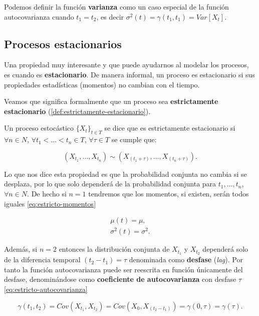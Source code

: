 Podemos definir la función \textbf{varianza} como un caso especial de la función autocovarianza cuando $t_1 = t_2$, es decir $\sigma^2(t) = \gamma(t_1, t_1) = Var[X_t]$.

\subsection{Procesos estacionarios}

Una propiedad muy interesante y que puede ayudarnos al modelar los procesos, es cuando es \textbf{estacionario}. De manera informal, un proceso es estacionario si sus propiedades estadísticas (momentos) no cambian con el tiempo.

Veamos que significa formalmente que un proceso sea \textbf{estrictamente estacionario} (\autoref{def:estrictamente-estacionario}).

\begin{definicion}
  Un proceso estocástico $\{X_t\}_{t \in T}$ se dice que es estrictamente estacionario si $\forall n \in N$, $\forall t_1 < \ldots < t_n \in T$, $\forall \tau \in T$ se cumple que:

    $$\left( X_{t_1}, \ldots, X_{t_n}\right) \sim \left( X_{(t_1 + \tau)}, \ldots, X_{(t_n + \tau)}\right).$$
  \label{def:estrictamente-estacionario}
\end{definicion}

Lo que nos dice esta propiedad es que la probabilidad conjunta no cambia si se desplaza, por lo que solo dependerá de la probabilidad conjunta para $t_1, \ldots, t_n$, $\forall n \in N$. De hecho si $n=1$ tendremos que los momentos, si existen, serán todos iguales \eqref{eq:estricto-momentos}

\begin{gather}
  \mu(t) = \mu, \\
  \sigma^2(t) = \sigma^2.
  \label{eq:estricto-momentos}
\end{gather}

Además, si $n = 2$ entonces la distribución conjunta de $X_{t_1}$ y $X_{t_2}$ dependerá solo de la diferencia temporal $(t_2 - t_1) = \tau$ denominada como \textbf{desfase} (\emph{lag}). Por tanto la función autocovarianza puede ser reescrita en función únicamente del desfase, denominándose como \textbf{coeficiente de autocovarianza} con desfase $\tau$ \eqref{eq:estricto-autocovarianza}

\begin{equation}
  \gamma(t_1, t_2) = Cov(X_{t_1}, X_{t_2}) = Cov(X_{0}, X_{(t_2 - t_1)}) = \gamma(0, \tau) = \gamma(\tau).
  \label{eq:estricto-autocovarianza}
\end{equation}

